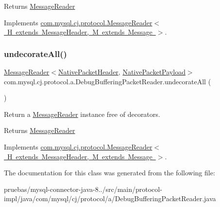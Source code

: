 \begin{DoxyReturn}{Returns}
\mbox{\hyperlink{interfacecom_1_1mysql_1_1cj_1_1protocol_1_1_message_reader}{Message\+Reader}} 
\end{DoxyReturn}


Implements \mbox{\hyperlink{interfacecom_1_1mysql_1_1cj_1_1protocol_1_1_message_reader_a59b0e118857c167ad4a270845f19e89b}{com.\+mysql.\+cj.\+protocol.\+Message\+Reader$<$ H extends Message\+Header, M extends Message $>$}}.

\mbox{\label{classcom_1_1mysql_1_1cj_1_1protocol_1_1a_1_1_debug_buffering_packet_reader_ae6337b7785d1c8adb1b4784387c2f959}} 
\subsubsection{\texorpdfstring{undecorate\+All()}{undecorateAll()}}
{\footnotesize\ttfamily \mbox{\hyperlink{interfacecom_1_1mysql_1_1cj_1_1protocol_1_1_message_reader}{Message\+Reader}}$<$\mbox{\hyperlink{classcom_1_1mysql_1_1cj_1_1protocol_1_1a_1_1_native_packet_header}{Native\+Packet\+Header}}, \mbox{\hyperlink{classcom_1_1mysql_1_1cj_1_1protocol_1_1a_1_1_native_packet_payload}{Native\+Packet\+Payload}}$>$ com.\+mysql.\+cj.\+protocol.\+a.\+Debug\+Buffering\+Packet\+Reader.\+undecorate\+All (\begin{DoxyParamCaption}{ }\end{DoxyParamCaption})}

Return a \mbox{\hyperlink{interfacecom_1_1mysql_1_1cj_1_1protocol_1_1_message_reader}{Message\+Reader}} instance free of decorators.

\begin{DoxyReturn}{Returns}
\mbox{\hyperlink{interfacecom_1_1mysql_1_1cj_1_1protocol_1_1_message_reader}{Message\+Reader}} 
\end{DoxyReturn}


Implements \mbox{\hyperlink{interfacecom_1_1mysql_1_1cj_1_1protocol_1_1_message_reader_a22a326215a91e4d7bff08d1f2c3e1b6d}{com.\+mysql.\+cj.\+protocol.\+Message\+Reader$<$ H extends Message\+Header, M extends Message $>$}}.



The documentation for this class was generated from the following file\+:\begin{DoxyCompactItemize}
\item 
pruebas/mysql-\/connector-\/java-\/8../src/main/protocol-\/impl/java/com/mysql/cj/protocol/a/Debug\+Buffering\+Packet\+Reader.\+java\end{DoxyCompactItemize}
